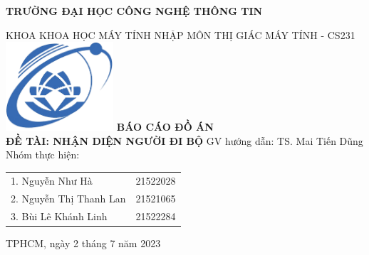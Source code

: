 \begin{titlepage}
\begin{center}
    \textbf{\large TRƯỜNG ĐẠI HỌC CÔNG NGHỆ THÔNG TIN} \\
    {\large KHOA KHOA HỌC MÁY TÍNH\vfill
    NHẬP MÔN THỊ GIÁC MÁY TÍNH - CS231\vfill
    \includegraphics[width=0.3\textwidth]{graphics/UIT.png} \vfill
    \textbf{\Large BÁO CÁO ĐỒ ÁN}\\
    \smallskip
    \textbf{\Large ĐỀ TÀI: NHẬN DIỆN NGƯỜI ĐI BỘ}\vfill
    GV hướng dẫn: TS. Mai Tiến Dũng \vfill
    Nhóm thực hiện: \vspace{0.5cm} \\
    \begin{tabular}{l r}
        1. Nguyễn Như Hà & 21522028 \\
        2. Nguyễn Thị Thanh Lan & 21521065 \\
        3. Bùi Lê Khánh Linh & 21522284 \\
    \end{tabular} \vfill
    TPHCM, ngày 2 tháng 7 năm 2023
    }
\end{center}
\end{titlepage}